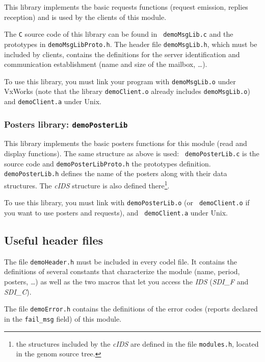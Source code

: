 This library implements  the basic requests  functions (request emission,
replies reception) and is used by the clients of this module.

The {\tt   C}  source code    of  this  library  can be   found  in  {\tt
demoMsgLib.c} and the  prototypes in {\tt demoMsgLibProto.h}.  The header
file {\tt demoMsgLib.h}, which must  be included by clients, contains the
definitions for the server identification and communication establishment
(name and size of the mailbox, \ldots).

To use this  library, you must link your  program with {\tt demoMsgLib.o}
under VxWorks (note that the  library {\tt demoClient.o} already includes
{\tt demoMsgLib.o}) and {\tt demoClient.a} under Unix.


\subsubsection{Posters library: {\tt demoPosterLib}}

This library implements the basic posters functions for this module (read
and display   functions).  The same    structure as above  is used:  {\tt
demoPosterLib.c} is  the  source code and  {\tt demoPosterLibProto.h} the
prototypes definition.  {\tt demoPosterLib.h}   defines the name  of  the
posters along  with  their data structures.  The  {\em cIDS} structure is
also defined there\footnote{the structures included by the {\em cIDS} are
defined in the file {\tt modules.h}, located in the genom source tree.}.

To  use this library,  you must link  with {\tt demoPosterLib.o} (or {\tt
demoClient.o}  if you  want  to  use   posters and requests),  and   {\tt
demoClient.a} under Unix.


\subsection{Useful header files}

The file {\tt  demoHeader.h} must  be included  in every  codel file.  It
contains the definitions of several constants that characterize the module
(name, period, posters, \ldots)  as well as the two  macros that let  you
access the {\em IDS} ({\em SDI\_F} and {\em SDI\_C}).

The file  {\tt demoError.h} contains the  definitions of the  error codes
(reports declared in the {\tt fail\_msg} field) of this module.

